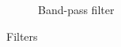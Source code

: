 \documentclass[10pt]{PhysLab1C} %
\begin{document}
\begin{figure}[h]
\begin{subfigure}[b]{0.3\textwidth}
         \caption{Band-pass filter}
         \label{band-pass-1}
     \end{subfigure}
     \medskip
        \caption{Filters}
        \label{filters}
\end{figure}


\end{document}
